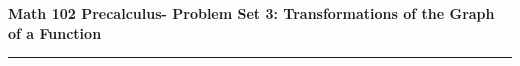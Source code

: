 \documentclass[12pt]{amsart}
\newcommand{\class}{Math 102}
\newcommand{\term}{Precalculus}
\newcommand{\quiztitle}{Problem Set 3: Transformations of the Graph of a Function}
\begin{document}
\textbf{\class \xspace\xspace \term \xspace\xspace - \quiztitle\\}
\rule[1ex]{\textwidth}{.1pt}

\vspace{1em}

\end{document}
